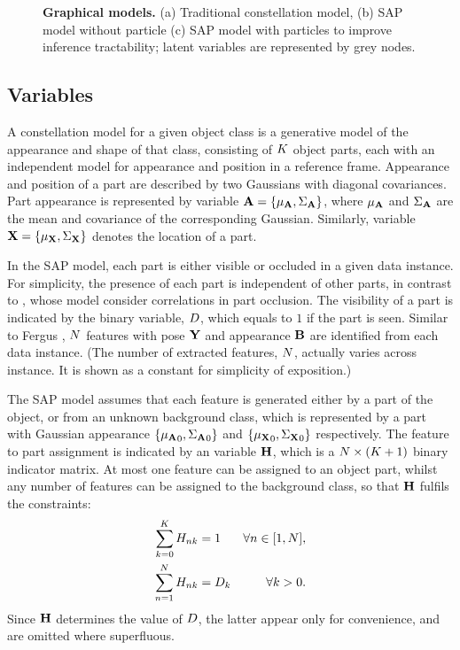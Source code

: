 \begin{figure}[ht]
\begin{subfigure}[t]{0.48\linewidth}
	\label{fig/reg/graphicalModelParticle}
\end{subfigure}
\caption{\textbf{Graphical models.} (a) Traditional constellation model, (b) SAP model without particle (c) SAP model with particles to improve inference tractability; latent variables are represented by grey nodes.}
\label{fig/reg/graphicalmodel}
\end{figure} 

\subsection{Variables}

A constellation model for a given object class is a generative model of the appearance and shape of that class, consisting of $K$ object parts, each with an independent model for appearance and position in a reference frame. Appearance and position of a part are described by two Gaussians with diagonal covariances. Part appearance is represented by variable $\mathbf{A}=\{{\mu_{\mathbf{A}}},{\Sigma_{\mathbf{A}}}\}$, where ${\mu_{\mathbf{A}}}$ and ${\Sigma_{\mathbf{A}}}$ are the mean and covariance of the corresponding Gaussian. Similarly, variable $\mathbf{X}=\{{\mu_{\mathbf{X}}},{\Sigma_{\mathbf{X}}}\}$ denotes the location of a part. 

In the SAP model, each part is either visible or occluded in a given data instance.   
For simplicity, the presence of each part is independent of other parts, in contrast to \cite{Fergus2007, Weber2000}, whose model consider correlations in part occlusion. 
The visibility of a part is indicated by the binary variable, ${D}$, which equals to $1$ if the part is seen. Similar to Fergus \etal \cite{Fergus2007}, $N$ features with pose $\mathbf{Y}$ and appearance $\mathbf{B}$ are identified from each data instance. (The number of extracted features, $N$, actually varies across instance. It is shown as a constant for simplicity of exposition.)  

The SAP model assumes that each feature is generated either by a part of the object, or from an unknown background class, which is represented by a part with Gaussian appearance $\{{\mu_{\mathbf{A}}}_0, {\Sigma_{\mathbf{A}}}_0\}$ and $\{{\mu_{\mathbf{X}}}_0, {\Sigma_{\mathbf{X}}}_0\}$ respectively. 
The feature to part assignment is indicated by an variable $\mathbf{H}$, which is a $N \times (K + 1)$ binary indicator matrix. 
At most one feature can be assigned to an object part, whilst any number of features can be assigned to the background class, so that $\mathbf{H}$ fulfils the constraints: 
\begin{equation}
	\begin{aligned}
		\sum_{k = 0}^{K}{H}_{nk}& =1 & \forall n \in [1, N], \\ 
		\sum_{n = 1}^{N}{H}_{nk}& ={D}_k & \forall k>0.
	\end{aligned} 
\end{equation}
Since $\mathbf{H}$ determines the value of ${D}$, the latter appear only for convenience, and are omitted where superfluous. 

